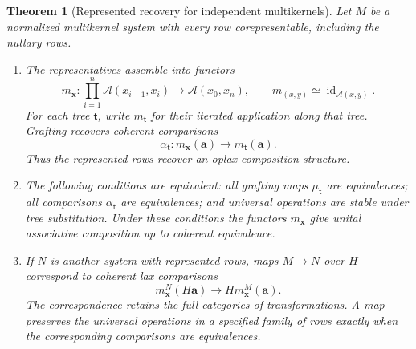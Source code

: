 \documentclass[oneside]{article}
\theoremstyle{plain}
\newtheorem{theorem}{Theorem}[section]
\theoremstyle{definition}
\theoremstyle{remark}
\newcommand{\id}{\operatorname{id}}
\begin{document}
\begin{theorem}[Represented recovery for independent multikernels]
\label{thm:independent-represented-recovery}
Let $M$ be a normalized multikernel system with every row
corepresentable, including the nullary rows.
\begin{enumerate}
\item The representatives assemble into functors
\[
 m_{\mathbf x}:
 \prod_{i=1}^n\mathcal A(x_{i-1},x_i)
 \longrightarrow\mathcal A(x_0,x_n),
 \qquad m_{(x,y)}\simeq\id_{\mathcal A(x,y)}.
\]
For each tree $\mathsf t$, write $m_{\mathsf t}$ for their iterated
application along that tree. Grafting recovers coherent comparisons
\begin{equation}\label{eq:oplax-composition-comparison}
 \alpha_{\mathsf t}:m_{\mathbf x}(\mathbf a)
 \longrightarrow m_{\mathsf t}(\mathbf a).
\end{equation}
Thus the represented rows recover an oplax composition structure.
\item The following conditions are equivalent: all grafting maps
$\mu_{\mathsf t}$ are equivalences; all comparisons
$\alpha_{\mathsf t}$ are equivalences; and universal operations
are stable under tree substitution. Under these conditions the
functors $m_{\mathbf x}$ give unital associative composition up to
coherent equivalence.
\item If $N$ is another system with represented rows, maps
$M\to N$ over $H$ correspond to coherent lax comparisons
\begin{equation}\label{eq:multikernel-lax-comparison}
 m^N_{\mathbf x}(H\mathbf a)
 \longrightarrow Hm^M_{\mathbf x}(\mathbf a).
\end{equation}
The correspondence retains the full categories of transformations.
A map preserves the universal operations in a specified family
of rows exactly when the corresponding comparisons are equivalences.
\end{enumerate}
\end{theorem}
\end{document}
